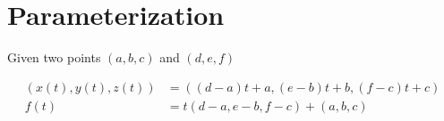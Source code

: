 \section{Parameterization}

  Given two points $ \left( a, b, c \right) $ and $ \left( d, e, f \right) $

  \begin{align}
    \left(
      x\left( t \right), y\left( t \right), z\left( t \right)
    \right)
    &=
    \left(
      \left( d - a \right)t + a,
      \left( e - b \right)t + b,
      \left( f - c \right)t + c
    \right) \\
    f\left( t \right) &=
    t \left( d - a, e - b, f - c \right)
    + \left( a, b, c  \right)
  \end{align}